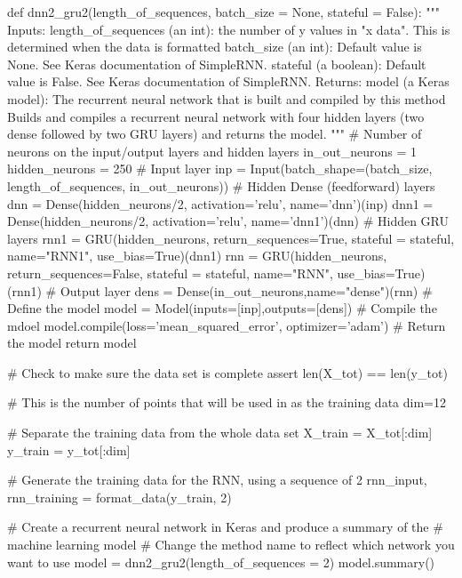 \documentclass[%
oneside,                 %
final,                   %
10pt]{article}
\begin{document}
def dnn2_gru2(length_of_sequences, batch_size = None, stateful = False):
    """
        Inputs:
            length_of_sequences (an int): the number of y values in "x data".  This is determined
                when the data is formatted
            batch_size (an int): Default value is None.  See Keras documentation of SimpleRNN.
            stateful (a boolean): Default value is False.  See Keras documentation of SimpleRNN.
        Returns:
            model (a Keras model): The recurrent neural network that is built and compiled by this
                method
        Builds and compiles a recurrent neural network with four hidden layers (two dense followed by
        two GRU layers) and returns the model.
    """    
    # Number of neurons on the input/output layers and hidden layers
    in_out_neurons = 1
    hidden_neurons = 250
    # Input layer
    inp = Input(batch_shape=(batch_size, 
                length_of_sequences, 
                in_out_neurons)) 
    # Hidden Dense (feedforward) layers
    dnn = Dense(hidden_neurons/2, activation='relu', name='dnn')(inp)
    dnn1 = Dense(hidden_neurons/2, activation='relu', name='dnn1')(dnn)
    # Hidden GRU layers
    rnn1 = GRU(hidden_neurons, 
                    return_sequences=True,
                    stateful = stateful,
                    name="RNN1", use_bias=True)(dnn1)
    rnn = GRU(hidden_neurons, 
                    return_sequences=False,
                    stateful = stateful,
                    name="RNN", use_bias=True)(rnn1)
    # Output layer
    dens = Dense(in_out_neurons,name="dense")(rnn)
    # Define the model
    model = Model(inputs=[inp],outputs=[dens])
    # Compile the mdoel
    model.compile(loss='mean_squared_error', optimizer='adam')  
    # Return the model
    return model

# Check to make sure the data set is complete
assert len(X_tot) == len(y_tot)

# This is the number of points that will be used in as the training data
dim=12

# Separate the training data from the whole data set
X_train = X_tot[:dim]
y_train = y_tot[:dim]


# Generate the training data for the RNN, using a sequence of 2
rnn_input, rnn_training = format_data(y_train, 2)


# Create a recurrent neural network in Keras and produce a summary of the 
# machine learning model
# Change the method name to reflect which network you want to use
model = dnn2_gru2(length_of_sequences = 2)
model.summary()
\end{document}
